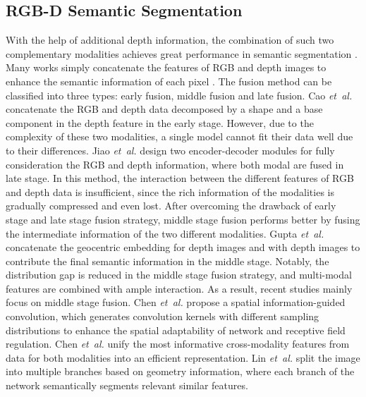 \documentclass[10pt,twocolumn,letterpaper]{article}
\begin{document}
\subsection{RGB-D Semantic Segmentation} With the help of additional depth information, the combination of such two complementary
modalities achieves great performance in semantic segmentation \cite{chen2021spatial,ren2012rgb,silberman2012indoor,jiao2019geometry,cao2021shapeconv,
   gupta2013perceptual,khan2016integrating}. Many works simply concatenate the features of RGB and depth images to enhance the semantic
information of each pixel \cite{silberman2012indoor,ren2012rgb}. The fusion method can be classified into three types: early fusion,
middle fusion and late fusion. Cao \textit{et~al.} \cite{cao2021shapeconv} concatenate the RGB and depth data decomposed by a shape
and a base component in the depth feature in the early stage. However, due to the complexity of these two modalities, a single model
cannot fit their data well due to their differences. Jiao \textit{\textit{et~al.}} \cite{jiao2019geometry} design two encoder-decoder
modules for fully consideration the RGB and depth information, where both modal are fused in late stage. In this method, the
interaction between the different features of RGB and depth data is insufficient, since the rich information of the modalities is
gradually compressed and even lost. After overcoming the drawback of early stage and late stage fusion strategy, middle stage fusion
performs better by fusing the intermediate information of the two different modalities. Gupta \textit{et~al.} \cite{gupta2014learning}
concatenate the geocentric embedding for depth images and with depth images to contribute the final semantic information in the
middle stage. Notably, the distribution gap is reduced in the middle stage fusion strategy, and multi-modal features are combined
with ample interaction. As a result, recent studies mainly focus on middle stage fusion. Chen \textit{et~al.} \cite{chen2021spatial}
propose a spatial information-guided convolution, which generates convolution kernels with different sampling distributions to enhance
the spatial adaptability of network and receptive field regulation. Chen \textit{et~al.} \cite{chen2020bi} unify the most informative
cross-modality features from data for both modalities into an efficient representation. Lin \textit{et~al.} \cite{lin2017cascaded}
split the image into multiple branches based on geometry information, where each branch of the network semantically segments relevant
similar features.
\end{document}
